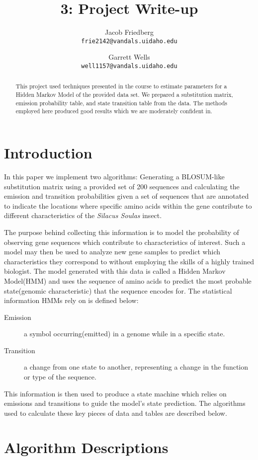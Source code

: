 \documentclass[a4paper,11pt]{article}
\title{3: Project Write-up}
\author{
Jacob Friedberg \\
\texttt{frie2142@vandals.uidaho.edu}
\and
Garrett Wells \\
\texttt{well1157@vandals.uidaho.edu}
}
\begin{document}
\maketitle
\begin{abstract}
    \noindent This project used techniques presented in the course to estimate parameters for a Hidden Markov Model of the provided data set. We prepared a substitution matrix, emission probability table, and state transition table from the data. The methods employed here produced good results which we are moderately confident in.
\end{abstract}

\section{Introduction}
In this paper we implement two algorithms: Generating a BLOSUM-like substitution matrix using a provided set of 200 sequences and calculating the emission and transition probabilities given a set of sequences that are annotated to indicate the locations where specific amino acids within the gene contribute to different characteristics of the \textit{Silacus Soulas} insect.

The purpose behind collecting this information is to model the probability of observing gene sequences which contribute to characteristics of interest. Such a model may then be used to analyze new gene samples to predict which characteristics they correspond to without employing the skills of a highly trained biologist. The model generated with this data is called a Hidden Markov Model(HMM) and uses the sequence of amino acids to predict the most probable state(genomic characteristic) that the sequence encodes for. The statistical information HMMs rely on is defined below:


\begin{description}
    \item[Emission] a symbol occurring(emitted) in a genome while in a specific state.
    \item[Transition] a change from one state to another, representing a change in the function or type of the sequence.
\end{description}

This information is then used to produce a state machine which relies on emissions and transitions to guide the model's state prediction. The algorithms used to calculate these key pieces of data and tables are described below.


\section{Algorithm Descriptions}
\end{document}
